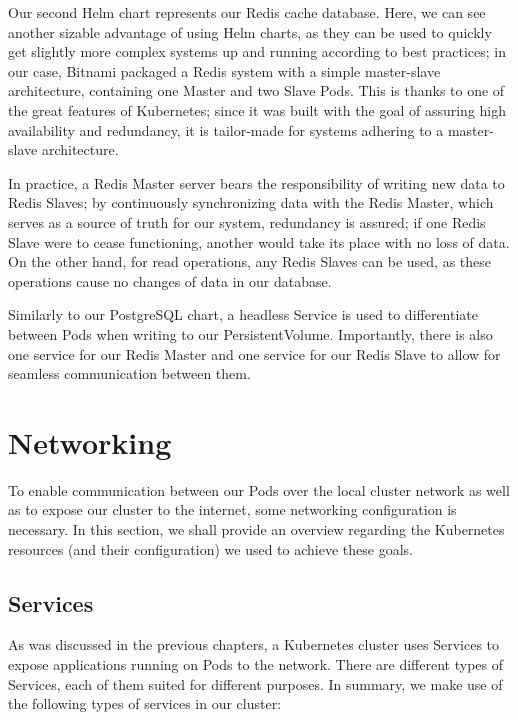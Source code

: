 \documentclass[thesis=B,english]{FITthesis}[2019/12/23]
\begin{document}
Our second Helm chart represents our Redis cache database. Here, we can see another sizable advantage of using Helm charts, as they can be used to quickly get slightly more complex systems up and running according to best practices; in our case, Bitnami packaged a Redis system with a simple master-slave architecture, containing one Master and two Slave Pods. This is thanks to one of the great features of Kubernetes; since it was built with the goal of assuring high availability and redundancy, it is tailor-made for systems adhering to a master-slave architecture.

In practice, a Redis Master server bears the responsibility of writing new data to Redis Slaves; by continuously synchronizing data with the Redis Master, which serves as a source of truth for our system, redundancy is assured; if one Redis Slave were to cease functioning, another would take its place with no loss of data. On the other hand, for read operations, any Redis Slaves can be used, as these operations cause no changes of data in our database. \cite{redis}

Similarly to our PostgreSQL chart, a headless Service is used to differentiate between Pods when writing to our PersistentVolume. Importantly, there is also one service for our Redis Master and one service for our Redis Slave to allow for seamless communication between them.

\section{Networking}

To enable communication between our Pods over the local cluster network as well as to expose our cluster to the internet, some networking configuration is necessary. In this section, we shall provide an overview regarding the Kubernetes resources (and their configuration) we used to achieve these goals.

\subsection{Services}

As was discussed in the previous chapters, a Kubernetes cluster uses Services to expose applications running on Pods to the network. There are different types of Services, each of them suited for different purposes. In summary, we make use of the following types of services in our cluster:
\end{document}

